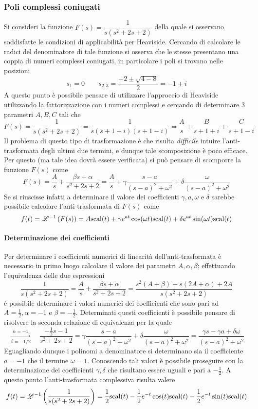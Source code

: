 		\subsubsection{Poli complessi coniugati}
			Si consideri la funzione $F(s) = \dfrac{1}{s(s^2+2s+2)}	$ della quale si osservano soddisfatte le condizioni di applicabilità per Heaviside. Cercando di calcolare le radici del denominatore di tale funzione si osserva che le stesse presentano una coppia di numeri complessi coniugati, in particolare i poli si trovano nelle posizioni
			\[ s_1 = 0 \qquad s_{2,3} = \frac{-2\pm \sqrt{4-8}}{2} = -1\pm i\]
			A questo punto è possibile pensare di utilizzare l'approccio di Heaviside utilizzando la fattorizzazione con i numeri complessi e cercando di determinare 3 parametri $A,B,C$ tali che
			\[F(s) = \dfrac{1}{s(s^2+2s+2)} = \frac{1}{s(s+1+i)(s+1-i)} = \frac A s + \frac{B}{s+1+i} + \frac{C}{s+1-i}\]
			Il problema di questo tipo di trasformazione è che risulta \textit{difficile} intuire l'anti-trasformata degli ultimi due termini, e dunque tale scomposizione è poco efficace. Per questo (ma tale idea dovrà essere verificata) si può pensare di scomporre la funzione $F(s)$ come
			\[F(s) = \frac A s + \frac{\beta s + \alpha}{s^2+2s+2} = \frac A s + \gamma \frac{s-a}{(s-a)^2+\omega^2} +\delta \frac{\omega}{(s-a)^2+\omega^2} \]
			Se si riuscisse infatti a determinare il valore dei coefficienti $\gamma,a,\omega$ e $\delta$ sarebbe possibile calcolare l'anti-trasformata di $F(s)$ come
			\[f(t) = \mathscr {L}^{-1} \left( F(s) \right) = A \textrm{scal}(t) + \gamma e^{at}\cos(\omega t) \textrm{scal}(t) + \delta e^{at} \sin(\omega t)\textrm{scal}(t)\]
			
			\paragraph{Determinazione dei coefficienti} Per determinare i coefficienti numerici di linearità dell'anti-trasformata è necessario in primo luogo calcolare il valore dei parametri $A,\alpha,\beta$; effettuando l'equivalenza delle due espressioni
			\[\frac{1}{s(s^2+2s+2)}  = \frac A s + \frac{\beta s + \alpha}{s^2+2s+2} = \frac{s^2(A+\beta) + s(2A+\alpha) + 2A}{s(s^2+2s+2)}\]
			è possibile determinare i valori numerici dei coefficienti che sono pari ad $A=\frac 1 2,\alpha = -1$ e $\beta = - \frac 1 2$. Determinati questi coefficienti è possibile pensare di risolvere la seconda relazione di equivalenza per la quale
			\[ \xrightarrow[\beta = - 1/2]{\alpha = -1} \quad \frac{-\frac 1 2 s - 1}{s^2+2s+2} = \gamma \frac{s-a}{(s-a)^2+\omega^2} +\delta \frac{\omega}{(s-a)^2+\omega^2} = \frac{\gamma s -\gamma a + \delta \omega }{(s-a)^2+\omega^2} \]
			Eguagliando dunque i polinomi a denominatore si determinano sia il coefficiente $a = -1$ che il termine $\omega= 1$. Conoscendo tali valori è possibile proseguire con la determinazione dei coefficienti $\gamma,\delta$ che risultano essere uguali e pari a $-\frac 1 2$. A questo punto l'anti-trasformata complessiva risulta valere
			\[f(t) = \mathscr {L}^{-1} \left( \frac{1}{s(s^2+2s+2)} \right) = \frac 1 2 \textrm{scal}(t) -\frac 1 2 e^{-t}\cos(t)\textrm{scal}(t) - \frac 1 2 e^{-t}\sin(t)\textrm{scal}(t)  \]
			
